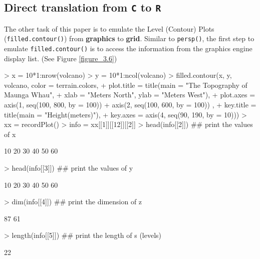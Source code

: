 \documentclass[11pt,twoside]{report}
\begin{document}
\subsection{Direct translation from \texttt{C} to \texttt{R}}
The other task of this paper is to emulate the Level (Contour) Plots (\texttt{filled.contour()}) from \textbf{graphics} to \textbf{grid}. Similar to \texttt{persp()}, the first step to emulate \texttt{filled.contour()} is to access the information from the graphics engine display list. (See Figure \ref{figure_3.6})
\begin{Schunk}
\begin{Sinput}
> x = 10*1:nrow(volcano)
> y = 10*1:ncol(volcano)
> filled.contour(x, y, volcano, color = terrain.colors,
+               plot.title = title(main = "The Topography of Maunga Whau",
+               xlab = "Meters North", ylab = "Meters West"),
+               plot.axes = { axis(1, seq(100, 800, by = 100))
+               axis(2, seq(100, 600, by = 100)) },
+               key.title = title(main = "Height\n(meters)"),
+               key.axes = axis(4, seq(90, 190, by = 10)))
> xx = recordPlot()
> info = xx[[1]][[12]][[2]]
> head(info[[2]])  ## print the values of x
\end{Sinput}
\begin{Soutput}
[1] 10 20 30 40 50 60
\end{Soutput}
\begin{Sinput}
> head(info[[3]])  ## print the values of y
\end{Sinput}
\begin{Soutput}
[1] 10 20 30 40 50 60
\end{Soutput}
\begin{Sinput}
> dim(info[[4]])  ## print the dimension of z
\end{Sinput}
\begin{Soutput}
[1] 87 61
\end{Soutput}
\begin{Sinput}
> length(info[[5]])  ## print the length of s (levels)
\end{Sinput}
\begin{Soutput}
[1] 22
\end{Soutput}
\end{Schunk}
\end{document}
